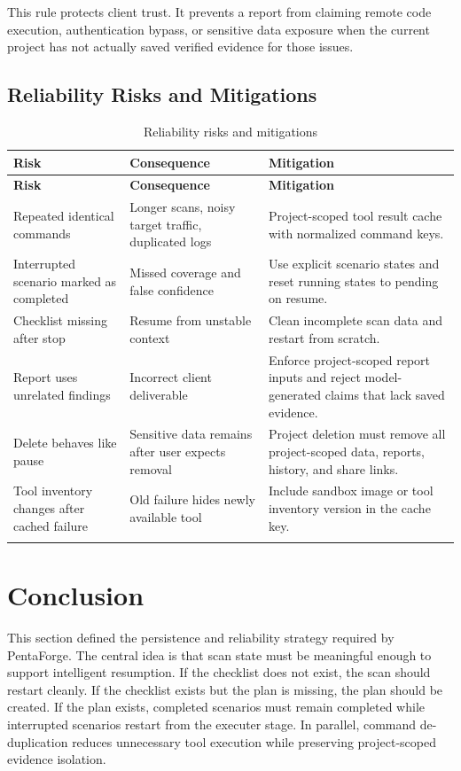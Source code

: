 \documentclass[12pt,a4paper]{report}
\begin{document}
This rule protects client trust. It prevents a report from claiming remote code
execution, authentication bypass, or sensitive data exposure when the current project
has not actually saved verified evidence for those issues.

\subsection{Reliability Risks and Mitigations}

\begin{longtable}{|p{}|p{}|p{}|}
\hline
\textbf{Risk} & \textbf{Consequence} & \textbf{Mitigation} \\
\hline
\endfirsthead
\hline
\textbf{Risk} & \textbf{Consequence} & \textbf{Mitigation} \\
\hline
\endhead
Repeated identical commands & Longer scans, noisy target traffic, duplicated logs &
Project-scoped tool result cache with normalized command keys. \\
\hline
Interrupted scenario marked as completed & Missed coverage and false confidence &
Use explicit scenario states and reset running states to pending on resume. \\
\hline
Checklist missing after stop & Resume from unstable context & Clean incomplete scan
data and restart from scratch. \\
\hline
Report uses unrelated findings & Incorrect client deliverable & Enforce project-scoped
report inputs and reject model-generated claims that lack saved evidence. \\
\hline
Delete behaves like pause & Sensitive data remains after user expects removal & Project
deletion must remove all project-scoped data, reports, history, and share links. \\
\hline
Tool inventory changes after cached failure & Old failure hides newly available tool &
Include sandbox image or tool inventory version in the cache key. \\
\hline
\caption{Reliability risks and mitigations}
\label{tab:reliability_risks}
\end{longtable}

\section*{Conclusion}

This section defined the persistence and reliability strategy required by PentaForge.
The central idea is that scan state must be meaningful enough to support intelligent
resumption. If the checklist does not exist, the scan should restart cleanly. If the
checklist exists but the plan is missing, the plan should be created. If the plan
exists, completed scenarios must remain completed while interrupted scenarios restart
from the executer stage. In parallel, command de-duplication reduces unnecessary tool
execution while preserving project-scoped evidence isolation.
\end{document}
